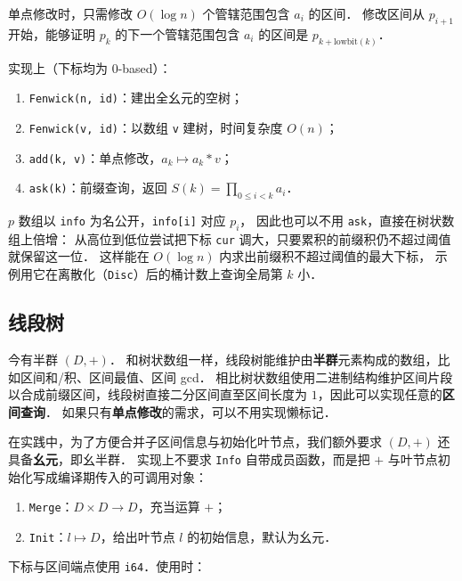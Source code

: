 单点修改时，只需修改 $O(\log n)$ 个管辖范围包含 $a_i$ 的区间．
修改区间从 $p_{i+1}$ 开始，能够证明 $p_k$ 的下一个管辖范围包含 $a_i$ 的区间是 $p_{k + \text{lowbit}(k)}$．

实现上（下标均为 0-based）：

\begin{enumerate}[noitemsep]
    \item {\tt Fenwick(n, id)}：建出全幺元的空树；
    \item {\tt Fenwick(v, id)}：以数组 {\tt v} 建树，时间复杂度 $O(n)$；
    \item {\tt add(k, v)}：单点修改，$a_k \mapsto a_k * v$；
    \item {\tt ask(k)}：前缀查询，返回 $S(k) = \prod_{0 \le i < k} a_i$．
\end{enumerate}

$p$ 数组以 {\tt info} 为名公开，{\tt info[i]} 对应 $p_i$，
因此也可以不用 {\tt ask}，直接在树状数组上倍增：
从高位到低位尝试把下标 {\tt cur} 调大，只要累积的前缀积仍不超过阈值就保留这一位．
这样能在 $O(\log n)$ 内求出前缀积不超过阈值的最大下标，
示例用它在离散化（{\tt Disc}）后的桶计数上查询全局第 $k$ 小．



\subsection{线段树}

今有半群 $(D, +)$．
和树状数组一样，线段树能维护由{\bf 半群}元素构成的数组，比如区间和/积、区间最值、区间 gcd．
相比树状数组使用二进制结构维护区间片段以合成前缀区间，线段树直接二分区间直至区间长度为 $1$，因此可以实现任意的{\bf 区间查询}．
如果只有{\bf 单点修改}的需求，可以不用实现懒标记．

在实践中，为了方便合并子区间信息与初始化叶节点，我们额外要求 $(D, +)$ 还具备{\bf 幺元}，即幺半群．
实现上不要求 {\tt Info} 自带成员函数，而是把 $+$ 与叶节点初始化写成编译期传入的可调用对象：

\begin{enumerate}[noitemsep]
    \item {\tt Merge}：$D \times D \rightarrow D$，充当运算 $+$；
    \item {\tt Init}：$l \mapsto D$，给出叶节点 $l$ 的初始信息，默认为幺元．
\end{enumerate}

下标与区间端点使用 {\tt i64}．使用时：

